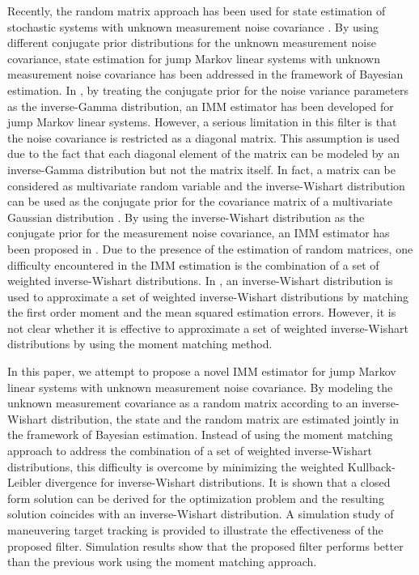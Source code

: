 \documentclass[12pt,draftcls,onecolumn]{IEEEtran}
\begin{document}
Recently, the random matrix approach has been used for state
estimation of stochastic systems with unknown measurement noise
covariance \cite{2009ieeetac,2011ieeetaes}. By using different
conjugate prior distributions for the unknown measurement noise
covariance, state estimation for jump Markov linear systems with
unknown measurement noise covariance has been addressed in the
framework of Bayesian estimation. In \cite{ourwork1}, by treating
the conjugate prior for the noise variance parameters as the
inverse-Gamma distribution, an IMM estimator has been developed for
jump Markov linear systems. However, a serious limitation in this
filter is that the noise covariance is restricted as a diagonal
matrix. This assumption is used due to the fact that each diagonal
element of the matrix can be modeled by an inverse-Gamma
distribution but not the matrix itself. In fact, a matrix can be
considered as multivariate random variable and the inverse-Wishart
distribution can be used as the conjugate prior for the covariance
matrix of a multivariate Gaussian distribution \cite{1999mvd}. By
using the inverse-Wishart distribution as the conjugate prior for
the measurement noise covariance, an IMM estimator has been proposed
in \cite{ourwork2}. Due to the presence of the estimation of random
matrices, one difficulty encountered in the IMM estimation is the
combination of a set of weighted inverse-Wishart distributions. In
\cite{ourwork2}, an inverse-Wishart distribution is used to
approximate a set of weighted inverse-Wishart distributions by
matching the first order moment and the mean squared estimation
errors. However, it is not clear whether it is effective to
approximate a set of weighted inverse-Wishart distributions by using
the moment matching method.



In this paper, we attempt to propose a novel IMM estimator for jump
Markov linear systems with unknown measurement noise covariance. By
modeling the unknown measurement covariance as a random matrix
according to an inverse-Wishart distribution, the state and the
random matrix are estimated jointly in the framework of Bayesian
estimation. Instead of using the moment matching approach to address
the combination of a set of weighted inverse-Wishart distributions,
this difficulty is overcome by minimizing the weighted
Kullback-Leibler divergence for inverse-Wishart distributions. It is
shown that a closed form solution can be derived for the
optimization problem and the resulting solution coincides with an
inverse-Wishart distribution. A simulation study of maneuvering
target tracking is provided to illustrate the effectiveness of the
proposed filter. Simulation results show that the proposed filter
performs better than the previous work using the moment matching
approach.
\end{document}

